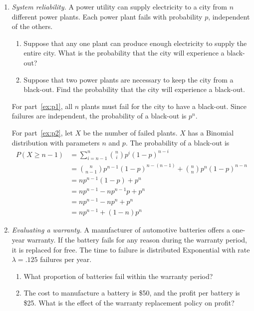 \begin{enumerate}
\item \emph{System reliability.} 
A power utility can supply electricity to a city
from $n$ different power plants. Each power plant fails with
probability $p$, independent of the others.
\begin{enumerate}
\item Suppose that any one plant can produce enough electricity to
supply the entire city. What is the probability that the city will
experience a black-out? \label{ex:p1}
\item Suppose that two power plants are necessary to keep the city
from a black-out. Find the probability that the city will
experience a black-out. 
\label{ex:p2}
\end{enumerate}

\begin{solution}
\bs
For part~\ref{ex:p1}, all $n$ plants must fail for the city to
have a black-out. Since failures are independent, the probability
of a black-out is $p^n$.

For part~\ref{ex:p2}, let $X$ be the number of failed plants. $X$
has a Binomial distribution with parameters $n$ and $p$. The probability
of a black-out is
\begin{align*}
  P(X \geq n-1) &= \sum_{i=n-1}^n {n \choose i} p^i (1-p)^{n-i} \\
                &= {n \choose n-1} p^{n-1} (1-p)^{n-(n-1)} + {n \choose n} p^n (1-p)^{n-n} \\
                &= np^{n-1}(1-p) + p^n \\
                &= np^{n-1} - np^{n-1}p + p^n\\
                &= np^{n-1} - np^n + p^n\\
                &= np^{n-1} + (1-n)p^n
\end{align*}
\end{solution}

\item \emph{Evaluating a warranty.}
  A manufacturer of automotive batteries offers a one-year
  warranty. If the battery fails for any reason during the warranty
  period, it is replaced for free. The time to failure is distributed
  Exponential with rate $\lambda=.125$ failures per year.
\begin{enumerate}
\item What proportion of batteries fail within the warranty period?
\item The cost to manufacture a battery is \$50, and the profit
per battery is \$25. What is the effect of the warranty replacement
policy on profit? \label{ex:profit}
\end{enumerate}


\end{enumerate}
